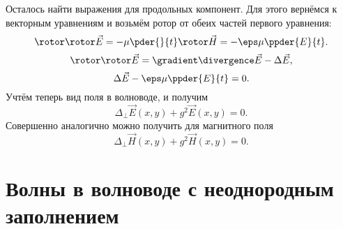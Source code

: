 \documentclass[a4paper]{hedsemwork}
\begin{document}
    Осталось найти выражения для продольных компонент. Для этого вернёмся к
    векторным уравнениям и возьмём ротор от обеих частей первого уравнения:
    \[
        \rotor\rotor\vec{E} = -\mu \pder{}{t}\rotor\vec{H} =
        -\eps\mu\ppder{E}{t}.
    \]
    \[
        \rotor\rotor\vec{E} = \gradient\divergence\vec{E} - \Delta\vec{E},
    \]
    \[
        \Delta\vec{E} - \eps\mu\ppder{E}{t} = 0.
    \]
    Учтём теперь вид поля в волноводе, и получим
    \[
        \Delta_\perp \vec{E}(x,y) + g^2\vec{E}(x,y) = 0.
    \]
    Совершенно аналогично можно получить для магнитного поля
    \[
        \Delta_\perp \vec{H}(x,y) + g^2\vec{H}(x,y) = 0.
    \]

\section{Волны в волноводе с неоднородным заполнением}
\end{document}
